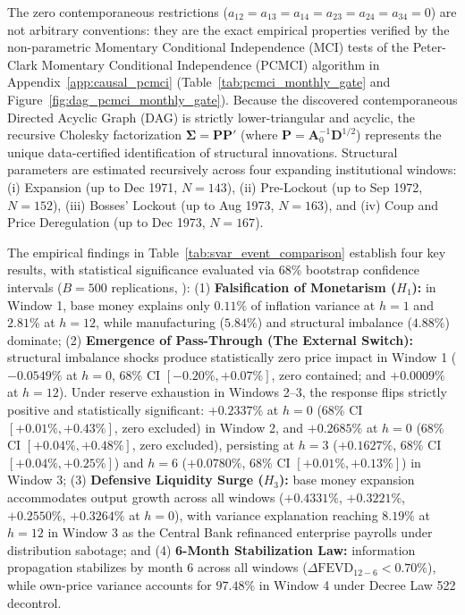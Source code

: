 The zero contemporaneous restrictions ($a_{12} = a_{13} = a_{14} = a_{23} = a_{24} = a_{34} = 0$) are not arbitrary conventions: they are the exact empirical properties verified by the non-parametric Momentary Conditional Independence (MCI) tests of the Peter-Clark Momentary Conditional Independence (PCMCI) algorithm \citep{Runge2019} in Appendix~\ref{app:causal_pcmci} (Table~\ref{tab:pcmci_monthly_gate} and Figure~\ref{fig:dag_pcmci_monthly_gate}). Because the discovered contemporaneous Directed Acyclic Graph (DAG) is strictly lower-triangular and acyclic, the recursive Cholesky factorization $\mathbf{\Sigma} = \mathbf{P} \mathbf{P}'$ (where $\mathbf{P} = \mathbf{A}_0^{-1} \mathbf{D}^{1/2}$) represents the unique data-certified identification of structural innovations. Structural parameters are estimated recursively across four expanding institutional windows: (i) Expansion (up to Dec 1971, $N=143$), (ii) Pre-Lockout (up to Sep 1972, $N=152$), (iii) Bosses' Lockout (up to Aug 1973, $N=163$), and (iv) Coup and Price Deregulation (up to Dec 1973, $N=167$).

The empirical findings in Table~\ref{tab:svar_event_comparison} establish four key results, with statistical significance evaluated via 68\% bootstrap confidence intervals ($B=500$ replications, \citealp{SimsZha1999}): (1) \textbf{Falsification of Monetarism ($H_1$):} in Window 1, base money explains only $0.11\%$ of inflation variance at $h=1$ and $2.81\%$ at $h=12$, while manufacturing ($5.84\%$) and structural imbalance ($4.88\%$) dominate; (2) \textbf{Emergence of Pass-Through (The External Switch):} structural imbalance shocks produce statistically zero price impact in Window 1 ($-0.0549\%$ at $h=0$, 68\% CI $[-0.20\%, +0.07\%]$, zero contained; and $+0.0009\%$ at $h=12$). Under reserve exhaustion in Windows 2--3, the response flips strictly positive and statistically significant: $+0.2337\%$ at $h=0$ (68\% CI $[+0.01\%, +0.43\%]$, zero excluded) in Window 2, and $+0.2685\%$ at $h=0$ (68\% CI $[+0.04\%, +0.48\%]$, zero excluded), persisting at $h=3$ ($+0.1627\%$, 68\% CI $[+0.04\%, +0.25\%]$) and $h=6$ ($+0.0780\%$, 68\% CI $[+0.01\%, +0.13\%]$) in Window 3; (3) \textbf{Defensive Liquidity Surge ($H_3$):} base money expansion accommodates output growth across all windows ($+0.4331\%$, $+0.3221\%$, $+0.2550\%$, $+0.3264\%$ at $h=0$), with variance explanation reaching $8.19\%$ at $h=12$ in Window 3 as the Central Bank refinanced enterprise payrolls under distribution sabotage; and (4) \textbf{6-Month Stabilization Law:} information propagation stabilizes by month 6 across all windows ($\Delta \text{FEVD}_{12-6} < 0.70\%$), while own-price variance accounts for $97.48\%$ in Window 4 under Decree Law 522 decontrol.



